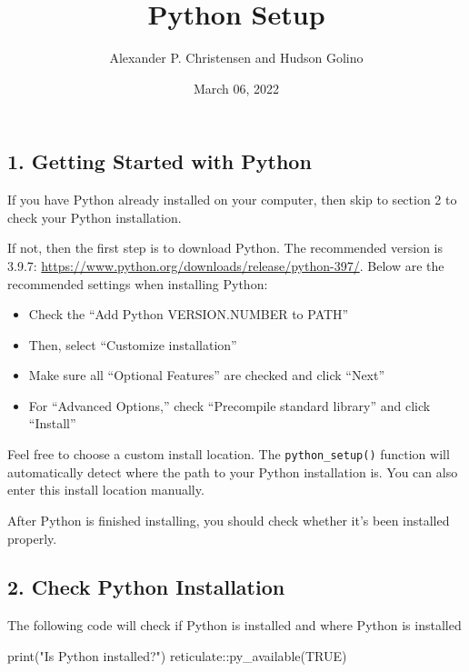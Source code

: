 \documentclass[
]{article}
\title{Python Setup}
\author{Alexander P. Christensen and Hudson Golino}
\date{March 06, 2022}
\newenvironment{Shaded}{\begin{snugshade}}{\end{snugshade}}
\newcommand{\ConstantTok}[1]{\textcolor[rgb]{0.00,0.00,0.00}{#1}}
\newcommand{\FunctionTok}[1]{\textcolor[rgb]{0.00,0.00,0.00}{#1}}
\newcommand{\NormalTok}[1]{#1}
\newcommand{\SpecialCharTok}[1]{\textcolor[rgb]{0.00,0.00,0.00}{#1}}
\newcommand{\StringTok}[1]{\textcolor[rgb]{0.31,0.60,0.02}{#1}}
\begin{document}
\maketitle

\hypertarget{section_1}{%
\subsection{1. Getting Started with Python}\label{section_1}}

If you have Python already installed on your computer, then skip to
section 2 to check your Python installation.

If not, then the first step is to download Python. The recommended
version is 3.9.7:
\url{https://www.python.org/downloads/release/python-397/}. Below are
the recommended settings when installing Python:

\begin{itemize}
\item
  Check the ``Add Python VERSION.NUMBER to PATH''
\item
  Then, select ``Customize installation''
\item
  Make sure all ``Optional Features'' are checked and click ``Next''
\item
  For ``Advanced Options,'' check ``Precompile standard library'' and
  click ``Install''
\end{itemize}

Feel free to choose a custom install location. The
\texttt{python\_setup()} function will automatically detect where the
path to your Python installation is. You can also enter this install
location manually.

After Python is finished installing, you should check whether it's been
installed properly.

\hypertarget{check-python-installation}{%
\subsection{2. Check Python
Installation}\label{check-python-installation}}

The following code will check if Python is installed and where Python is
installed

\begin{Shaded}
\begin{Highlighting}[]
\FunctionTok{print}\NormalTok{(}\StringTok{"Is Python installed?"}\NormalTok{)}
\NormalTok{reticulate}\SpecialCharTok{::}\FunctionTok{py\_available}\NormalTok{(}\ConstantTok{TRUE}\NormalTok{)}
\end{Highlighting}
\end{Shaded}
\end{document}

